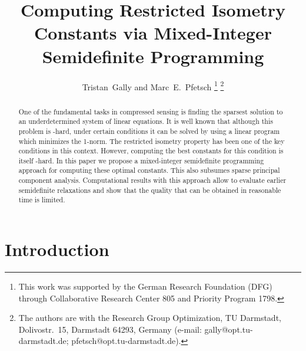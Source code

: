 \documentclass[journal]{IEEEtran}
\newcommand{\NP}{\text{NP}}
\begin{document}
\title{Computing Restricted Isometry Constants via Mixed-Integer Semidefinite Programming}
\author{Tristan~Gally and Marc~E.~Pfetsch
  \thanks{This work was supported by the German Research Foundation (DFG) through Collaborative Research Center 805 and Priority Program 1798.}
  \thanks{The  authors  are  with  the  Research  Group  Optimization,  TU
    Darmstadt, Dolivostr.\ 15,
  Darmstadt  64293,  Germany  (e-mail:  gally@opt.tu-darmstadt.de;
  pfetsch@opt.tu-darmstadt.de).}}


\maketitle

\noindent
\begin{abstract}
  One of the fundamental tasks in compressed sensing is finding the
  sparsest solution to an underdetermined system of linear equations. It is
  well known that although this problem is \NP-hard, under certain
  conditions it can be solved by using a linear program which minimizes the
  1-norm. The restricted isometry property has been one of the key
  conditions in this context. However, computing the best constants for
  this condition is itself \NP-hard. In this paper we propose a
  mixed-integer semidefinite programming approach for computing these
  optimal constants. This also subsumes sparse principal component
  analysis. Computational results with this approach allow to evaluate
  earlier semidefinite relaxations and show that the quality that can be
  obtained in reasonable time is limited.
\end{abstract}

\section{Introduction}
\end{document}
